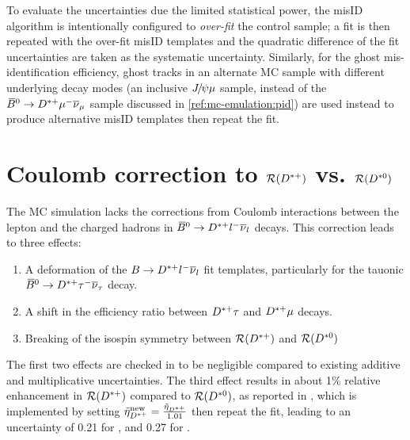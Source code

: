 To evaluate the uncertainties due the limited statistical power,
the misID algorithm is intentionally configured to \emph{over-fit} the control
sample;
a fit is then repeated with the over-fit misID templates and the quadratic
difference of the fit uncertainties are taken as the systematic uncertainty.
Similarly, for the ghost mis-identification efficiency,
ghost tracks in an alternate MC sample with different underlying decay modes
(an inclusive ${{J\mskip -3mu/\mskip -2mu\psi}}{\mu}$ sample,
instead of the ${{\kern 0.18em\overline{\kern -0.18em B}}{}^0} \rightarrow {\ensuremath{{D}^{*+}}} {\ensuremath{\mu^-}}{\ensuremath{{\overline{\nu}}_\mu}}$ sample discussed in
\cref{ref:mc-emulation:pid})
are used instead to produce alternative misID templates then repeat the fit.


\section{Coulomb correction to $\mathcal{R}({{D}^{*+}})$ vs. $\mathcal{R}({{D}^{*0}})$}
\label{sys-theory-coulomb}

The MC simulation lacks the corrections from Coulomb interactions between
the lepton and the charged hadrons in
${{\kern 0.18em\overline{\kern -0.18em B}}{}^0} \rightarrow {\ensuremath{{D}^{*+}}}{\ensuremath{l^-}}{\ensuremath{{\overline{\nu}}_l}}$ decays.
This correction leads to three effects:

\begin{enumerate}
    \item A deformation of the
        $B \rightarrow {\ensuremath{{D}^{*+}}}{\ensuremath{l^-}}{\ensuremath{{\overline{\nu}}_l}}$ fit templates,
        particularly for the tauonic
        ${{\kern 0.18em\overline{\kern -0.18em B}}{}^0} \rightarrow {\ensuremath{{D}^{*+}}}{\ensuremath{\tau^-}}{\ensuremath{{\overline{\nu}}_\tau}}$ decay.
    \item A shift in the efficiency ratio between ${{D}^{*+}}\tau$ and ${{D}^{*+}}\mu$
        decays.
    \item Breaking of the isospin symmetry between
        $\mathcal{R}({{D}^{*+}})$ and $\mathcal{R}({{D}^{*0}})$
\end{enumerate}

The first two effects are checked in \cite{LHCb-ANA-2020-056} to be negligible
compared to existing additive and multiplicative uncertainties.
The third effect results in about 1\% relative enhancement in $\mathcal{R}
({{D}^{*+}})$ compared to $\mathcal{R}({{D}^{*0}})$,
as reported in \cite{Cal__2019},
which is implemented by setting
$\tilde{\eta}_{{{D}^{*+}}}^\text{new} = \frac{\tilde{\eta}_{{{D}^{*+}}}}{1.01}$
then repeat the fit,
leading to an uncertainty of 0.21 for \RD,
and 0.27 for \RDst.



